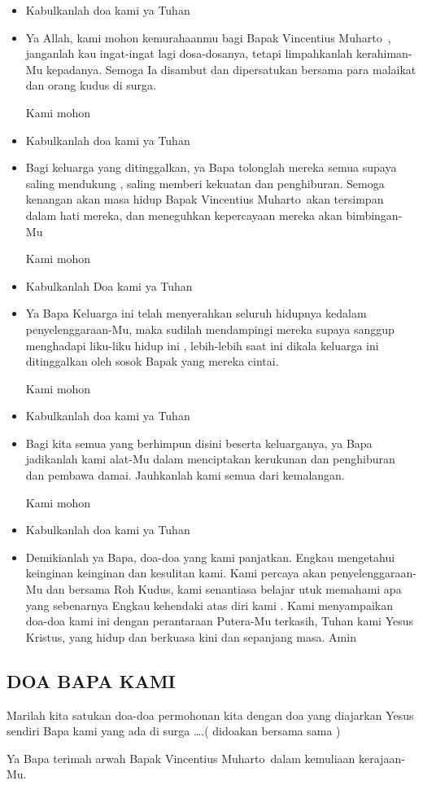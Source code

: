 \documentclass[a5paper,headsepline,titlepage,11pt,nnormalheadings,DIVcalc]{scrbook}
\newcommand{\BU}[1]{\begin{itemize} \item[U:] #1 \end{itemize}}
\newcommand{\BP}[1]{\begin{itemize} \item[P:] #1 \end{itemize}}
\newcommand{\namaalm}{Bapak Vincentius Muharto~}
\begin{document}
\BU{Kabulkanlah doa kami ya Tuhan}

\BP{Ya Allah, kami mohon kemurahaanmu bagi \namaalm , janganlah kau ingat-ingat lagi dosa-dosanya, tetapi limpahkanlah kerahiman-Mu kepadanya. Semoga Ia disambut dan dipersatukan bersama para malaikat dan orang kudus di surga.

Kami mohon}

\BU{Kabulkanlah doa kami ya Tuhan}

\BP{Bagi keluarga yang ditinggalkan, ya Bapa tolonglah mereka semua supaya saling mendukung , saling memberi kekuatan dan penghiburan. Semoga kenangan akan masa hidup \namaalm akan tersimpan dalam hati mereka, dan meneguhkan kepercayaan mereka akan bimbingan-Mu 

Kami mohon}

\BU{Kabulkanlah Doa kami ya Tuhan} 

\BP{Ya Bapa Keluarga ini telah menyerahkan seluruh hidupnya kedalam penyelenggaraan-Mu, maka sudilah mendampingi mereka supaya sanggup menghadapi liku-liku hidup ini , lebih-lebih saat ini dikala keluarga ini ditinggalkan oleh sosok Bapak yang mereka cintai.

Kami mohon}

\BU{Kabulkanlah doa kami ya Tuhan}

\BP{Bagi kita semua yang berhimpun disini beserta keluarganya, ya Bapa jadikanlah kami alat-Mu dalam menciptakan kerukunan dan penghiburan dan pembawa damai. Jauhkanlah kami semua dari kemalangan.

Kami mohon}

\BU{Kabulkanlah doa kami ya Tuhan}

\BP{Demikianlah ya Bapa, doa-doa yang kami panjatkan. Engkau mengetahui keinginan keinginan dan kesulitan kami. Kami percaya akan penyelenggaraan-Mu dan bersama Roh Kudus, kami senantiasa belajar utuk memahami apa yang sebenarnya Engkau kehendaki atas diri kami . Kami menyampaikan doa-doa kami ini dengan perantaraan Putera-Mu terkasih, Tuhan kami Yesus Kristus, yang hidup dan berkuasa kini dan sepanjang masa. Amin}


\subsection*{DOA BAPA KAMI}
Marilah kita satukan doa-doa permohonan kita dengan doa yang diajarkan Yesus sendiri 
Bapa kami yang ada di surga \dots .( didoakan bersama sama )

Ya Bapa terimah arwah \namaalm dalam kemuliaan kerajaan-Mu.
\end{document}
